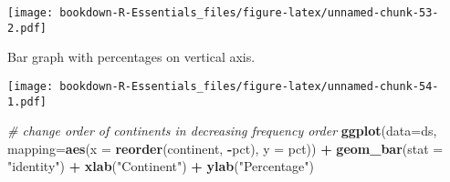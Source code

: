 \documentclass[]{book}
\newenvironment{Shaded}{\begin{snugshade}}{\end{snugshade}}
\newcommand{\KeywordTok}[1]{\textcolor[rgb]{0.13,0.29,0.53}{\textbf{#1}}}
\newcommand{\DataTypeTok}[1]{\textcolor[rgb]{0.13,0.29,0.53}{#1}}
\newcommand{\DecValTok}[1]{\textcolor[rgb]{0.00,0.00,0.81}{#1}}
\newcommand{\StringTok}[1]{\textcolor[rgb]{0.31,0.60,0.02}{#1}}
\newcommand{\CommentTok}[1]{\textcolor[rgb]{0.56,0.35,0.01}{\textit{#1}}}
\newcommand{\OperatorTok}[1]{\textcolor[rgb]{0.81,0.36,0.00}{\textbf{#1}}}
\newcommand{\NormalTok}[1]{#1}
\begin{document}
\texttt{[image: bookdown-R-Essentials\_files/figure-latex/unnamed-chunk-53-2.pdf]}

Bar graph with percentages on vertical axis.

\begin{Shaded}
\end{Shaded}

\texttt{[image: bookdown-R-Essentials\_files/figure-latex/unnamed-chunk-54-1.pdf]}

\begin{Shaded}
\begin{Highlighting}[]
\CommentTok{# change order of continents in decreasing frequency order}
\KeywordTok{ggplot}\NormalTok{(}\DataTypeTok{data=}\NormalTok{ds, }\DataTypeTok{mapping=}\KeywordTok{aes}\NormalTok{(}\DataTypeTok{x =} \KeywordTok{reorder}\NormalTok{(continent, }\OperatorTok{-}\NormalTok{pct), }\DataTypeTok{y =}\NormalTok{ pct)) }\OperatorTok{+}\StringTok{ }
\StringTok{  }\KeywordTok{geom_bar}\NormalTok{(}\DataTypeTok{stat =} \StringTok{"identity"}\NormalTok{) }\OperatorTok{+}\StringTok{ }
\StringTok{  }\KeywordTok{xlab}\NormalTok{(}\StringTok{"Continent"}\NormalTok{) }\OperatorTok{+}\StringTok{ }\KeywordTok{ylab}\NormalTok{(}\StringTok{"Percentage"}\NormalTok{)}
\end{Highlighting}
\end{Shaded}
\end{document}
